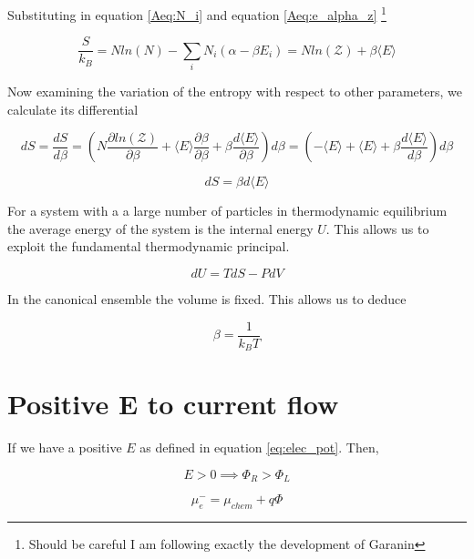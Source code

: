 Substituting in equation \ref{Aeq:N_i} and equation \ref{Aeq:e_alpha_z} \footnote[1]{Should be careful I am following exactly the development of Garanin}

\begin{equation}
    \frac{S}{k_B} = N ln(N) - \sum_{i} N_i (\alpha - \beta E_i)  = N ln(\mathcal{Z}) + \beta \langle E \rangle
\end{equation}

Now examining the variation of the entropy with respect to other parameters, we calculate its differential

\begin{equation}
    dS = \frac{dS}{d\beta} = \left( N \frac{\partial ln(\mathcal{Z})}{\partial \beta} + \langle E \rangle \frac{\partial \beta}{\partial \beta} + \beta \frac{d \langle E \rangle}{\partial \beta} \right) d\beta= \left(-\langle E \rangle + \langle E \rangle + \beta \frac{d \langle E \rangle} {d\beta} \right) d\beta
\end{equation}

\begin{equation}
    dS = \beta d\langle E \rangle
\end{equation}

For a system with a a large number of particles in thermodynamic equilibrium the average energy of the system is the internal energy $U$. This allows us to exploit the fundamental thermodynamic principal.

\begin{equation}
    dU = TdS - PdV
\end{equation}

In the canonical ensemble the volume is fixed. This allows us to deduce 

\begin{equation}
    \beta = \frac{1}{k_B T}
\end{equation}



\section{Positive E to current flow}

If we have a positive $E$ as defined in equation \ref{eq:elec_pot}. Then,

\begin{equation}
    E > 0 \implies \Phi_R > \Phi_L
\end{equation}

\begin{equation}
    \mu_\textit{e}^- = \mu_{chem} + q\Phi
\end{equation}

